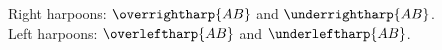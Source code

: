 \documentclass{article}
\begin{document}
Right harpoons: $\overrightharp{AB}$ and $\underrightharp{AB}$.\\
Left harpoons: $\overleftharp{AB}$ and $\underleftharp{AB}$.
\end{document}
